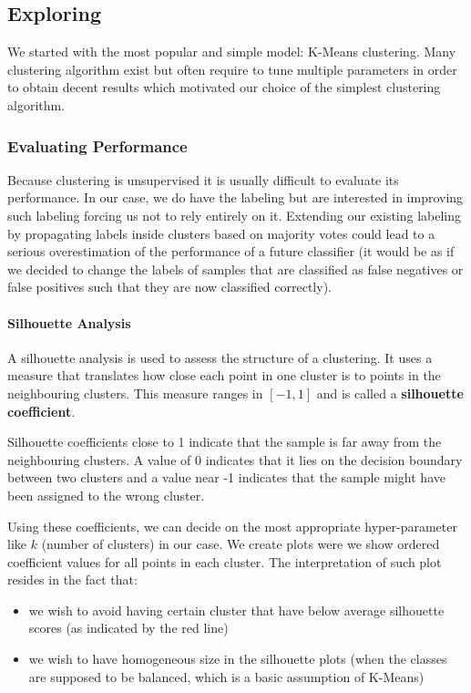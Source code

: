 \subsection{Exploring}
We started with the most popular and simple model: K-Means clustering. Many clustering algorithm exist but often require to tune multiple parameters in order to obtain decent results which motivated our choice of the simplest clustering algorithm.

\subsubsection{Evaluating Performance}
Because clustering is unsupervised it is usually difficult to evaluate its performance. In our case, we do have the labeling but are interested in improving such labeling forcing us not to rely entirely on it. Extending our existing labeling by propagating labels inside clusters based on majority votes could lead to a serious overestimation of the performance of a future classifier (it would be as if we decided to change the labels of samples that are classified as false negatives or false positives such that they are now classified correctly).

\paragraph{Silhouette Analysis}
A silhouette analysis is used to assess the structure of a clustering. It uses a measure that translates how close each point in one cluster is to points in the neighbouring clusters. This measure ranges in $[-1,1]$ and is called a \textbf{silhouette coefficient}. 

Silhouette coefficients close to 1 indicate that the sample is far away from the neighbouring clusters. A value of 0 indicates that it lies on the decision boundary between two clusters and a value near -1 indicates that the sample might have been assigned to the wrong cluster.

Using these coefficients, we can decide on the most appropriate hyper-parameter like $k$ (number of clusters) in our case. We create plots were we show ordered coefficient values for all points in each cluster. The interpretation of such plot resides in the fact that:
\begin{itemize}
	\item we wish to avoid having certain cluster that have below average silhouette scores (as indicated by the red line)
	\item we wish to have homogeneous size in the silhouette plots (when the classes are supposed to be balanced, which is a basic assumption of K-Means)
\end{itemize}

